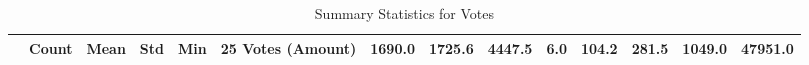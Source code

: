 \begin{table}
\caption{Summary Statistics for Votes}
\label{tab:votes_summary}
\begin{tabular}{lrrrrrrrr}
\toprule
 & Count & Mean & Std & Min & 25%
\midrule
Votes (Amount) & 1690.0 & 1725.6 & 4447.5 & 6.0 & 104.2 & 281.5 & 1049.0 & 47951.0 \\
\bottomrule
\end{tabular}
\end{table}
